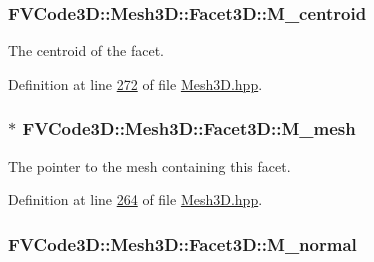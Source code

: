 \subsubsection[{\texorpdfstring{M\+\_\+centroid}{M_centroid}}]{ F\+V\+Code3\+D\+::\+Mesh3\+D\+::\+Facet3\+D\+::\+M\+\_\+centroid\hspace{0.3cm}{\ttfamily [private]}}\hypertarget{classFVCode3D_1_1Mesh3D_1_1Facet3D_a6f7dafb218d207354ad6454f4825728f}{}\label{classFVCode3D_1_1Mesh3D_1_1Facet3D_a6f7dafb218d207354ad6454f4825728f}


The centroid of the facet. 



Definition at line \hyperlink{Mesh3D_8hpp_source_l00272}{272} of file \hyperlink{Mesh3D_8hpp_source}{Mesh3\+D.\+hpp}.

\subsubsection[{\texorpdfstring{M\+\_\+mesh}{M_mesh}}]{$\ast$ F\+V\+Code3\+D\+::\+Mesh3\+D\+::\+Facet3\+D\+::\+M\+\_\+mesh\hspace{0.3cm}{\ttfamily [private]}}\hypertarget{classFVCode3D_1_1Mesh3D_1_1Facet3D_adf8cf45ade4804389de18428aea4969d}{}\label{classFVCode3D_1_1Mesh3D_1_1Facet3D_adf8cf45ade4804389de18428aea4969d}


The pointer to the mesh containing this facet. 



Definition at line \hyperlink{Mesh3D_8hpp_source_l00264}{264} of file \hyperlink{Mesh3D_8hpp_source}{Mesh3\+D.\+hpp}.

\subsubsection[{\texorpdfstring{M\+\_\+normal}{M_normal}}]{ F\+V\+Code3\+D\+::\+Mesh3\+D\+::\+Facet3\+D\+::\+M\+\_\+normal\hspace{0.3cm}{\ttfamily [private]}}\hypertarget{classFVCode3D_1_1Mesh3D_1_1Facet3D_ada6d0c218b56473802d91a34f2ecc4cf}{}\label{classFVCode3D_1_1Mesh3D_1_1Facet3D_ada6d0c218b56473802d91a34f2ecc4cf}


